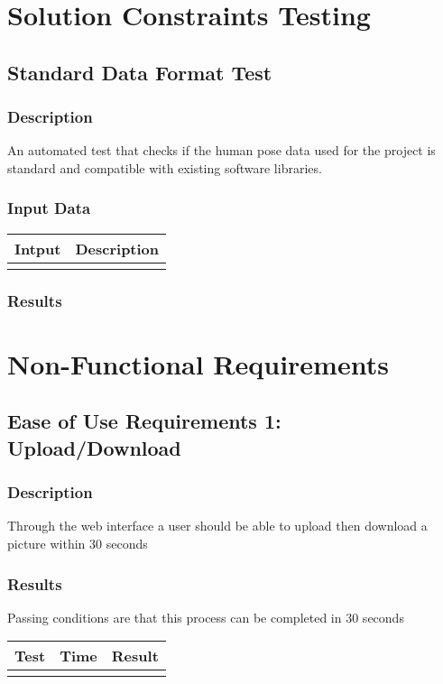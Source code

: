 \documentclass{scrreprt}
\begin{document}
\section{Solution Constraints Testing}
\subsection{Standard Data Format Test}
\subsubsection{Description}
An automated test that checks if the human pose data used for the project is standard and compatible with existing software libraries.
\subsubsection{Input Data}
\begin{table}[h!]
 \centering
 \begin{tabular}{p{3cm}p{6cm}}
 \hline\hline
 Intput & Description\\
 \hline\hline
   &  \\ %
 \hline
 \end{tabular}
 \label{table:1}
\end{table}
\subsubsection{Results}

\section{Non-Functional Requirements}
\subsection{Ease of Use Requirements 1: Upload/Download}
\subsubsection{Description}
Through the web interface a user should be able to upload then download a picture within 30 seconds
\subsubsection{Results}
Passing conditions are that this process can be completed in 30 seconds
\begin{table}[h!]
 \centering
 \begin{tabular}{||p{1.5cm}|p{1.5cm}|p{1.5cm}||}
 \hline
 \bf Test & \bf Time & \bf Result \\
 \hline\hline
   &  & \\ %
 \hline
 \end{tabular}
 \label{table:1}
\end{table}
\end{document}

